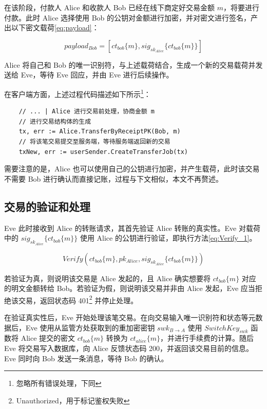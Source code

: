 在该阶段，付款人 Alice 和收款人 Bob 已经在线下商定好交易金额 $m$，将要进行付款。此时 Alice 选择使用 Bob 的公钥对金额进行加密，并对密文进行签名，产出以下密文载荷\eqref{eq:payload}：

\begin{equation} \label{eq:payload}
payload_{Bob} = [ct_{bob}\{m\}, sig_{sk_{Alice}}\{ct_{bob}\{m\}\}]    
\end{equation}

Alice 将自己和 Bob 的唯一识别符，与上述载荷结合，生成一个新的交易载荷并发送给 Eve，等待 Eve 回应，并由 Eve 进行后续操作。

在客户端方面，上述过程代码描述如下所示\footnote{忽略所有错误处理，下同}：

\begin{verbatim}
    // ... | Alice 进行交易前处理，协商金额 m
    // 进行交易结构体的生成
    tx, err := Alice.TransferByReceiptPK(Bob, m)
    // 将该笔交易提交至服务端，等待服务端返回新的交易
    txNew, err := userSender.CreateTransferJob(tx)
\end{verbatim}

需要注意的是，Alice 也可以使用自己的公钥进行加密，并产生载荷，此时该交易不需要 Bob 进行确认而直接记账，过程与下文相似，本文不再赘述。

\subsection{交易的验证和处理}

Eve 此时接收到 Alice 的转账请求，其首先验证 Alice 转账的真实性。Eve 对载荷中的 $sig_{sk_{Alice}}\{ct_{bob}\{m\}\}$ 使用 Alice 的公钥进行验证，即执行方法\eqref{eq:Verify_1}。

\begin{equation} \label{eq:Verify_1}
    Verify(ct_{bob}\{m\}, pk_{Alice}, sig_{sk_{Alice}}\{ct_{bob}\{m\}\})
\end{equation}

若验证为真，则说明该交易是 Alice 发起的，且 Alice 确实想要将 $ct_{bob}\{m\}$  对应的明文金额转给 Bob。若验证为假，则说明该交易并非由 Alice 发起，Eve 应当拒绝该交易，返回状态码 401\footnote{Unauthorized，用于标记鉴权失败} 并停止处理。

在验证真实性后，Eve 开始处理该笔交易。在向交易输入唯一识别符和状态等元数据后，Eve 使用从监管方处获取到的重加密密钥 $swk_{B \rightarrow A}$ 使用 $SwitchKey_{swk}$ 函数将 Alice 提交的密文 $ct_{bob}\{m\}$ 转换为 $ct_{alice}\{m\}$，并进行手续费的计算。随后 Eve 将交易写入数据库，向 Alice 反馈状态码 200，并返回该交易目前的信息。Eve 同时向 Bob 发送一条消息，等待 Bob 的确认。

